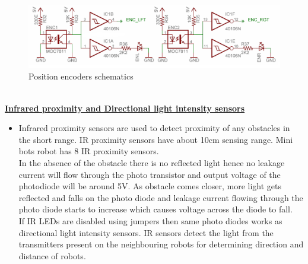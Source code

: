 \documentclass[a4paper,12pt,oneside]{book}
\begin{document}
	\hfill\\
	\begin{figure}[h!]
		\caption{Position encoders schematics}
		\includegraphics[width=\textwidth]{./HardwareManual/motor_encoder.png}
	\end{figure}

\hfill\\
\underline{\textbf{\Large{Infrared proximity and Directional light intensity sensors}}}
\begin{itemize}
	\item {
		Infrared proximity sensors are used to detect proximity of any obstacles in the short range. IR
		proximity sensors have about 10cm sensing range. Mini bots robot has 8 IR proximity sensors.\\
		In the absence of the obstacle there is no reflected light hence no leakage current will flow
		through the photo transistor and output voltage of the photodiode will be around 5V. As obstacle
		comes closer, more light gets reflected and falls on the photo diode and leakage current flowing
		through the photo diode starts to increase which causes voltage across the diode to fall.\\
		If IR LEDs are disabled using jumpers then same photo diodes works as directional light
		intensity sensors.
		IR sensors detect the light from the transmitters present on the neighbouring robots for determining direction and distance of robots.\\
	}
	\end{itemize}
\end{document}
